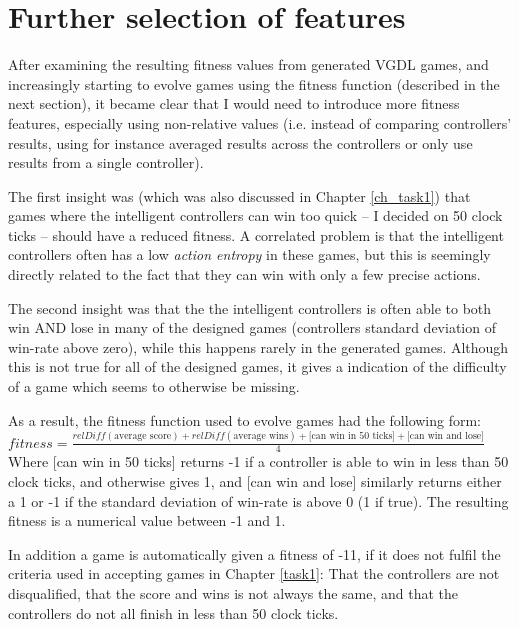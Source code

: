 \documentclass[a4paper,titlepage,final]{report}
\begin{document}


\section{Further selection of features}
\label{sec_task2furtherfeatures}

After examining the resulting fitness values from generated VGDL games, and increasingly starting to evolve games using the fitness function (described in the next section), it became clear that I would need to introduce more fitness features, especially using non-relative values (i.e. instead of comparing controllers' results, using for instance averaged results across the controllers or only use results from a single controller).

The first insight was (which was also discussed in Chapter \ref{ch_task1}) that games where the intelligent controllers can win too quick -- I decided on 50 clock ticks -- should have a reduced fitness.
A correlated problem is that the intelligent controllers often has a low \textit{action entropy} in these games, but this is seemingly directly related to the fact that they can win with only a few precise actions.

The second insight was that the the intelligent controllers is often able to both win AND lose in many of the designed games (controllers standard deviation of win-rate above zero), while this happens rarely in the generated games. 
Although this is not true for all of the designed games, it gives a indication of the difficulty of a game which seems to otherwise be missing.

As a result, the fitness function used to evolve games had the following form: \\

$fitness = \frac{relDiff(\text{average score}) + relDiff(\text{average wins}) + \text{[can win in 50 ticks]} + \text{[can win and lose]}}{4}$ \\

Where [can win in 50 ticks] returns -1 if a  controller is able to win in less than 50 clock ticks, and otherwise gives 1, and [can win and lose] similarly returns either a 1 or -1 if the standard deviation of win-rate is above 0 (1 if true).
The resulting fitness is a numerical value between -1 and 1.

In addition a game is automatically given a fitness of -11, if it does not fulfil the criteria used in accepting games in Chapter \ref{task1}: 
That the controllers are not disqualified, that the score and wins is not always the same, and that the controllers do not all finish in less than 50 clock ticks.
\end{document}
